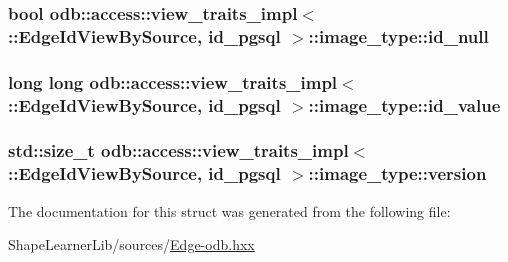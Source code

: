 \subsubsection[{id\+\_\+null}]{\setlength{\rightskip}{0pt plus 5cm}bool odb\+::access\+::view\+\_\+traits\+\_\+impl$<$ \+::{\bf Edge\+Id\+View\+By\+Source}, id\+\_\+pgsql $>$\+::image\+\_\+type\+::id\+\_\+null}\label{structodb_1_1access_1_1view__traits__impl_3_01_1_1_edge_id_view_by_source_00_01id__pgsql_01_4_1_1image__type_a2e00c76405cf6dcdaff637b86a12db69}
\hypertarget{structodb_1_1access_1_1view__traits__impl_3_01_1_1_edge_id_view_by_source_00_01id__pgsql_01_4_1_1image__type_ad0c009822f6be93c755b84d26051548b}{}
\subsubsection[{id\+\_\+value}]{\setlength{\rightskip}{0pt plus 5cm}long long odb\+::access\+::view\+\_\+traits\+\_\+impl$<$ \+::{\bf Edge\+Id\+View\+By\+Source}, id\+\_\+pgsql $>$\+::image\+\_\+type\+::id\+\_\+value}\label{structodb_1_1access_1_1view__traits__impl_3_01_1_1_edge_id_view_by_source_00_01id__pgsql_01_4_1_1image__type_ad0c009822f6be93c755b84d26051548b}
\hypertarget{structodb_1_1access_1_1view__traits__impl_3_01_1_1_edge_id_view_by_source_00_01id__pgsql_01_4_1_1image__type_ab59b6187d277725127a1757d74ebf154}{}
\subsubsection[{version}]{\setlength{\rightskip}{0pt plus 5cm}std\+::size\+\_\+t odb\+::access\+::view\+\_\+traits\+\_\+impl$<$ \+::{\bf Edge\+Id\+View\+By\+Source}, id\+\_\+pgsql $>$\+::image\+\_\+type\+::version}\label{structodb_1_1access_1_1view__traits__impl_3_01_1_1_edge_id_view_by_source_00_01id__pgsql_01_4_1_1image__type_ab59b6187d277725127a1757d74ebf154}


The documentation for this struct was generated from the following file\+:\begin{DoxyCompactItemize}
\item 
Shape\+Learner\+Lib/sources/\hyperlink{_edge-odb_8hxx}{Edge-\/odb.\+hxx}\end{DoxyCompactItemize}
